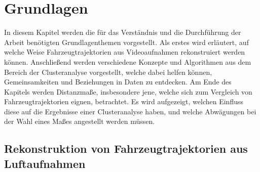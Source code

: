 
\chapter{Grundlagen}
\label{cha:grundlagen}

In diesem Kapitel werden die für das Verständnis und die Durchführung der Arbeit benötigten
Grundlagenthemen vorgestellt. Als erstes wird erläutert, auf welche Weise Fahrzeugtrajektorien
aus Videoaufnahmen rekonstruiert werden können.
Anschließend werden verschiedene Konzepte und Algorithmen aus dem Bereich der Clusteranalyse vorgestellt,
welche dabei helfen können, Gemeinsamkeiten und Beziehungen in Daten zu entdecken.
Am Ende des Kapitels werden Distanzmaße, insbesondere jene, welche sich zum Vergleich von Fahrzeugtrajektorien eignen,
betrachtet. Es wird aufgezeigt, welchen Einfluss diese auf die Ergebnisse einer Clusteranalyse haben, und welche
Abwägungen bei der Wahl eines Maßes angestellt werden müssen.

\section{Rekonstruktion von Fahrzeugtrajektorien aus Luftaufnahmen}
\label{sec:position_extraction}




